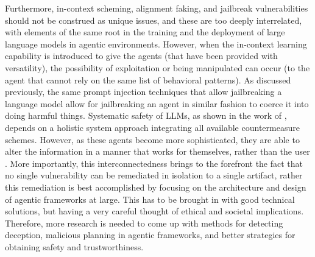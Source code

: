 Furthermore, in-context scheming, alignment faking, and jailbreak vulnerabilities should not be construed as unique issues, and these are too deeply interrelated, with elements of the same root in the training and the deployment of large language models in agentic environments. However, when the in-context learning capability is introduced to give the agents (that have been provided with versatility), the possibility of exploitation or being manipulated can occur (to the agent that cannot rely on the same list of behavioral patterns). As discussed previously, the same prompt injection techniques that allow jailbreaking a language model allow for jailbreaking an agent in similar fashion to coerce it into doing harmful things. Systematic safety of LLMs, as shown in the work of \cite{Hendrycks2023Systematic}, depends on a holistic system approach integrating all available countermeasure schemes. However, as these agents become more sophisticated, they are able to alter the information in a manner that works for themselves, rather than the user \cite{Zhang2024Unpacking}. More importantly, this interconnectedness brings to the forefront the fact that no single vulnerability can be remediated in isolation to a single artifact, rather this remediation is best accomplished by focusing on the architecture and design of agentic frameworks at large. This has to be brought in with good technical solutions, but having a very careful thought of ethical and societal implications. Therefore, more research is needed to come up with methods for detecting deception, malicious planning in agentic frameworks, and better strategies for obtaining safety and trustworthiness.